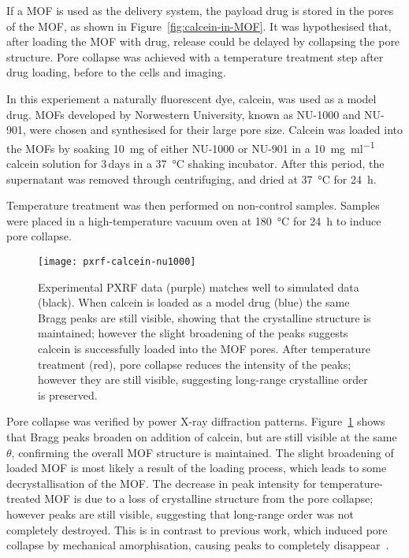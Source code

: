 If a MOF is used as the delivery system, the payload drug is stored in the pores of the MOF, as shown in Figure~\ref{fig:calcein-in-MOF}. 
It was hypothesised that, after loading the MOF with drug, release could be delayed by collapsing the pore structure. 
Pore collapse was achieved with a temperature treatment step after drug loading, before to the cells and imaging. 

In this experiement a naturally fluorescent dye, calcein, was used as a model drug. 
MOFs developed by Norwestern University, known as NU-1000 and NU-901, were chosen and synthesised for their large pore size. 
Calcein was loaded into the MOFs by soaking \SI{10}{\milli\gram} of either NU-1000 or NU-901 in a \SI[per-mode=symbol]{10}{\milli\gram\per\milli\litre} calcein solution for 3\,days in a \SI{37}{\degreeCelsius} shaking incubator. 
After this period, the supernatant was removed through centrifuging, and dried at \SI{37}{\degreeCelsius} for \SI{24}{\hour}. 

Temperature treatment was then performed on non-control samples. 
Samples were placed in a high-temperature vacuum oven at \SI{180}{\degreeCelsius} for \SI{24}{\hour} to induce pore collapse. 

\begin{figure}[htbp!]
\centering
\texttt{[image: pxrf-calcein-nu1000]}
\caption[MOFs: PXRF confirms calcein enters NU-1000 and temperature treatment causes partial pore collapse]{ Experimental PXRF data (purple) matches well to simulated data (black). When calcein is loaded as a model drug (blue) the same Bragg peaks are still visible, showing that the crystalline structure is maintained; however the slight broadening of the peaks suggests calcein is successfully loaded into the MOF pores. After temperature treatment (red), pore collapse reduces the intensity of the peaks; however they are still visible, suggesting long-range crystalline order is preserved. }
\label{fig:MOF-PXRF}
\end{figure}

Pore collapse was verified by power X-ray diffraction patterns. 
Figure~\ref{fig:MOF-PXRF} shows that Bragg peaks broaden on addition of calcein, but are still visible at the same $\theta$, confirming the overall MOF structure is maintained. 
The slight broadening of loaded MOF is most likely a result of the loading process, which leads to some decrystallisation of the MOF. 
The decrease in peak intensity for temperature-treated MOF is due to a loss of crystalline structure from the pore collapse; however peaks are still visible, suggesting that long-range order was not completely destroyed.
This is in contrast to previous work, which induced pore collapse by mechanical amorphisation, causing peaks to completely disappear~\cite{orellana2015amorphous}.

